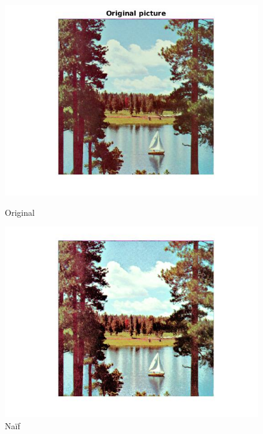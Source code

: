 \documentclass{article}
\begin{document}
\begin{figure}[h]
\centering
\begin{minipage}{0.33\textwidth}
\centering
\includegraphics[width=1\textwidth]{images/sail_conc_depart.jpg}
\caption{Original}
\end{minipage}%
\begin{minipage}{0.33\textwidth}
\centering
\includegraphics[width=1\textwidth]{images/sail_conc_inter.jpg}
\caption{Naïf}
\end{minipage}%
\begin{minipage}{0.33\textwidth}
\centering

\end{minipage}
\end{figure}
\end{document}
